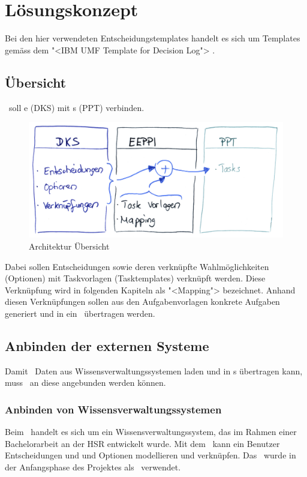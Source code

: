 \chapter{Lösungskonzept}
	
	Bei den hier verwendeten Entscheidungstemplates handelt es sich um Templates gemäss dem "<IBM UMF Template for Decision Log"> \cite{hand_ibm_2008}.
	
	\section{Übersicht}
		\eeppi\ soll \dks e (DKS) mit \ppt s (PPT) verbinden.
		
		\begin{figure}[H]
			\includegraphics[width=\textwidth]{architecture/media/img/eeppiSchema.jpg}
			\centering
			\caption{Architektur Übersicht}
			\label{fig:architectureSchema}
		\end{figure}	
		
		Dabei sollen Entscheidungen sowie deren verknüpfte Wahlmöglichkeiten (Optionen) mit Taskvorlagen (Tasktemplates) verknüpft werden.
		Diese Verknüpfung wird in folgenden Kapiteln als "<Mapping"> bezeichnet. 
		Anhand diesen Verknüpfungen sollen aus den Aufgabenvorlagen konkrete Aufgaben generiert und in ein \ppt\ übertragen werden.
	
	
	\section{Anbinden der externen Systeme}
		Damit \eeppi\ Daten aus Wissensverwaltungssystemen laden und in \ppt s übertragen kann, muss \eeppi\ an diese angebunden werden können.
		
	
		\subsection{Anbinden von Wissensverwaltungssystemen}
			Beim \cdar\ handelt es sich um ein Wissensverwaltungssystem, 
			das im Rahmen einer Bachelorarbeit \cite{tinner_collaborative_2014} an der HSR entwickelt wurde. Mit dem \cdar\ kann ein Benutzer Entscheidungen und und Optionen modellieren und verknüpfen. Das \cdar\ wurde in der Anfangsphase des Projektes als \dks\ verwendet.
			
